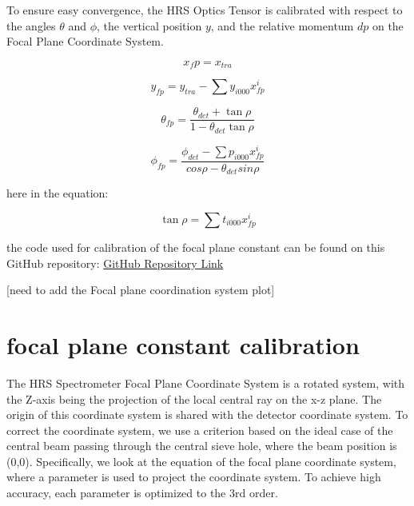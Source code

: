 To ensure easy convergence, the HRS Optics Tensor is calibrated with respect to the angles $\theta$ and $\phi$, the vertical position $y$, and the relative momentum $dp$ on the Focal Plane Coordinate System.

\begin{equation}
    x_fp = x_{tra}    \label{eq:cpt3_fps_1}
\end{equation}

\begin{equation}
    y_{fp} = y_{tra} - \sum y_{i000}x^i_{fp}  
\end{equation}

\begin{equation}
\theta_{fp} = \frac{\theta_{det} + \tan\rho}{1 - \theta_{det}\tan\rho}
\end{equation}


\begin{equation}
    \phi_{fp} = \frac{\phi_{det} - \sum p_{i000}x^i_{fp}}{cos \rho - \theta_{det} sin\rho}
\end{equation}

here  in the equation:

\begin{equation}
    \tan\rho  = \sum t_{i000}x^i_{fp} \label{eq:cpt3_fps_5}
\end{equation}


the code used for calibration of the focal plane constant can be found on this GitHub repository: \hyperlink{https://github.com/Jiansiyu/GeneralScripts/blob/master/vdcConstantOpt}{GitHub Repository Link}


[need to add the Focal plane coordination system plot]

\section{focal plane constant calibration}

The HRS Spectrometer Focal Plane Coordinate System is a rotated system, with the Z-axis being the projection of the local central ray on the x-z plane. The origin of this coordinate system is shared with the detector coordinate system. To correct the coordinate system, we use a criterion based on the ideal case of the central beam passing through the central sieve hole, where the beam position is (0,0). Specifically, we look at the equation of the focal plane coordinate system, where a parameter is used to project the coordinate system. To achieve high accuracy, each parameter is optimized to the 3rd order.

